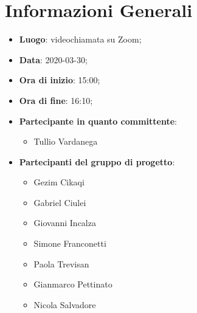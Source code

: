 \section{Informazioni Generali}
	\begin{itemize}
		\item \textbf {Luogo}: videochiamata su Zoom;
		\item \textbf {Data}: 2020-03-30;
		\item \textbf {Ora di inizio}: 15:00;
		\item \textbf {Ora di fine}: 16:10;
		\item \textbf {Partecipante in quanto committente}:
		  \begin{itemize}
		    \item Tullio Vardanega
		  \end{itemize}
		\item \textbf {Partecipanti del gruppo di progetto}:
			\begin{itemize}
				\item Gezim Cikaqi
				\item Gabriel Ciulei
				\item Giovanni Incalza
				\item Simone Franconetti
				\item Paola Trevisan
				\item Gianmarco Pettinato
				\item Nicola Salvadore
			\end{itemize}
	\end{itemize}
